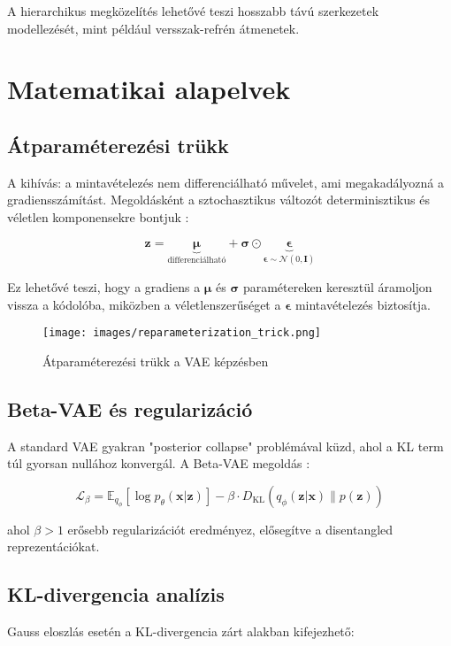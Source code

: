 A hierarchikus megközelítés lehetővé teszi hosszabb távú szerkezetek modellezését, mint például versszak-refrén átmenetek.

\section{Matematikai alapelvek}
\subsection{Átparaméterezési trükk}
A kihívás: a mintavételezés nem differenciálható művelet, ami megakadályozná a gradiensszámítást. Megoldásként a sztochasztikus változót determinisztikus és véletlen komponensekre bontjuk \cite{kingma2014auto}:

\[
\mathbf{z} = \underbrace{\boldsymbol{\mu}}_{\text{differenciálható}} + \boldsymbol{\sigma} \odot \underbrace{\boldsymbol{\epsilon}}_{\boldsymbol{\epsilon} \sim \mathcal{N}(0, \mathbf{I})}
\]

Ez lehetővé teszi, hogy a gradiens a $\boldsymbol{\mu}$ és $\boldsymbol{\sigma}$ paramétereken keresztül áramoljon vissza a kódolóba, miközben a véletlenszerűséget a $\boldsymbol{\epsilon}$ mintavételezés biztosítja.

\begin{figure}[h]
\centering
\texttt{[image: images/reparameterization\_trick.png]}
\caption{Átparaméterezési trükk a VAE képzésben}
\label{fig:reparam}
\end{figure}

\subsection{Beta-VAE és regularizáció}
A standard VAE gyakran "posterior collapse" problémával küzd, ahol a KL term túl gyorsan nullához konvergál. A Beta-VAE megoldás \cite{brunner2018midivae}:

\[
\mathcal{L}_{\beta} = \mathbb{E}_{q_\phi}[\log p_\theta(\mathbf{x}|\mathbf{z})] - \beta \cdot D_{\text{KL}}(q_\phi(\mathbf{z}|\mathbf{x}) \parallel p(\mathbf{z}))
\]

ahol $\beta > 1$ erősebb regularizációt eredményez, elősegítve a disentangled reprezentációkat.

\subsection{KL-divergencia analízis}
Gauss eloszlás esetén a KL-divergencia zárt alakban kifejezhető:

